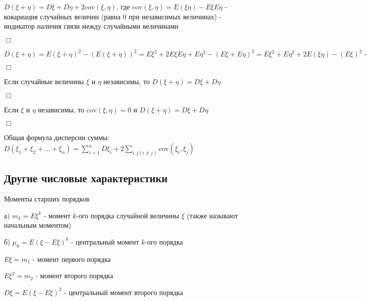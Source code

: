 \documentclass[12pt]{article}
\begin{document}
    \Def $D(\xi + \eta) = D\xi + D\eta + 2\mathrm{cov} (\xi, \eta)$,
    где $\mathrm{cov}(\xi, \eta) = E(\xi\eta) - E\xi E\eta$ - ковариация случайных величин (равна 0 при независимых величинах) - индикатор наличия связи между случайными величинами

    \begin{MyProof}
        $\Box$

    $D(\xi + \eta) = E(\xi + \eta)^2 - (E(\xi + \eta))^2 = E\xi^2 + 2E\xi E\eta + E\eta^2 - (E\xi + E\eta)^2 =
    E\xi^2 + E\eta^2 + 2E(\xi\eta) - (E\xi)^2 - (E\eta)^2 - 2E\xi E\eta = D\xi + D\eta + 2\mathrm{cov}(\xi, \eta)$

        $\Box$
    \end{MyProof}


    \begin{MyTheorem}
         Если случайные величины $\xi$ и $\eta$ независимы, то $D(\xi + \eta) = D\xi + D\eta$
    \end{MyTheorem}

    \begin{MyProof}
        $\Box$

        Если $\xi$ и $\eta$ независимы, то $\mathrm{cov}(\xi, \eta) = 0$ и $D(\xi + \eta) = D\xi + D\eta$

        $\Box$
    \end{MyProof}

    \begin{MyTheorem}
         Общая формула дисперсии суммы: $D(\xi_1 + \xi_2 + \dots + \xi_n) = \sum_{i = 1}^n D \xi_i + 2\sum_{i, j (i \neq j)} \mathrm{cov} (\xi_i, \xi_j)$
    \end{MyTheorem}

    \subsection{Другие числовые характеристики}

    Моменты старших порядков

    а) $m_k = E\xi^k$ - момент $k$-ого порядка случайной величины $\xi$ (также называют начальным моментом)

    б) $\mu_k = E(\xi - E\xi)^k$ - центральный момент $k$-ого порядка

    $E\xi = m_1$ - момент первого порядка

    $E\xi^2 = m_2$ - момент второго порядка

    $D\xi = E(\xi - E\xi)^2$ - центральный момент второго порядка
\end{document}
